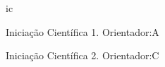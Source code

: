 

\label{orientacoes:pp}

\begin{comment}
\section{Orientações e supervisões em andamento}
\subsection{Dissertações de mestrado em andamento}
Não inserido
\subsection{Teses de doutorado em andamento}
Não inserido
\subsection{Pós-Doutorados em andamento}
Não inserido

\section{Orientações e supervisões concluídas}
\subsection{Dissertações de mestrado concluídas}
Não inserido
\subsection{Teses de doutorado concluídas}
Não inserido
\subsection{Pós-Doutorados concluídos}
Não inserido
\end{comment}

\begin{orientacao}{ic}
    \item Iniciação Científica 1. Orientador:A
    \item Iniciação Científica 2. Orientador:C
\end{orientacao}
    
